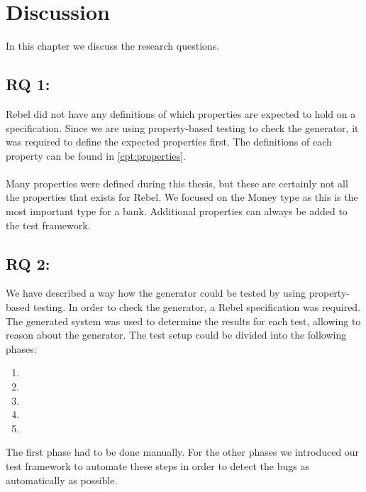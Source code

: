 \chapter{Discussion}
\label{cpt:7_discussion}
In this chapter we discuss the research questions.

\section{RQ 1: \rqOne{}}
Rebel did not have any definitions of which properties are expected to hold on a
specification. Since we are using property-based testing to check the generator,
it was required to define the expected properties first. The definitions of each
property can be found in \autoref{cpt:properties}.\\
\\
Many properties were defined during this thesis, but these are certainly not all
the properties that exists for Rebel. We focused on the Money type as this is
the most important type for a bank. Additional properties can always be added to
the test framework.

\section{RQ 2: \rqTwo{}}
We have described a way how the generator could be tested by using property-based testing. In order to check the generator, a Rebel specification was required. The generated system was used to determine the results for each test, allowing to reason about the generator. The test setup could be divided into the following phases:
\begin{enumerate}
  \item \tfPhaseOne{}
  \item \tfPhaseTwo{}
  \item \tfPhaseThree{}
  \item \tfPhaseFour{}
  \item \tfPhaseFive{}
\end{enumerate}
The first phase had to be done manually. For the other phases we introduced our test framework to automate these steps in order to detect the bugs as automatically as possible.

